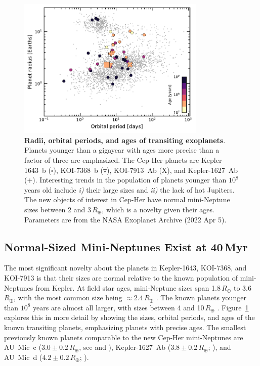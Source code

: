 \documentclass[12pt,twocolumn]{aastex63}
\begin{document}
\begin{figure}[!t]
	\begin{center}
		\leavevmode
		\includegraphics[width=0.8\textwidth]{f4.pdf}
	\end{center}
	\vspace{-0.6cm}
	\caption{
		{\bf Radii, orbital periods, and ages of transiting exoplanets}.
    Planets younger than a gigayear with ages more precise than a
    factor of three are emphasized. The Cep-Her planets are
    Kepler-1643~b ($\square$), KOI-7368~b ($\triangledown$),
    KOI-7913~Ab (X), and Kepler-1627~Ab (+).  Interesting trends in
    the population of planets younger than $10^8$ years old include {\it i)} their
    large sizes and {\it ii)} the lack of hot Jupiters.  The new
    objects of interest in Cep-Her have normal mini-Neptune sizes
    between 2 and 3\,$R_\oplus$, which is a novelty given their ages.
    Parameters are from the NASA Exoplanet Archive (2022 Apr 5).
		\label{fig:rp_period_age}
	}
\end{figure}


\subsection{Normal-Sized Mini-Neptunes Exist at 40$\,$Myr}
\label{subsec:sizes}

The most significant novelty about the planets in Kepler-1643, KOI-7368, and
KOI-7913 is that their sizes are normal relative to the known
population of mini-Neptunes from Kepler.  At field star ages,
mini-Neptune sizes span 1.8\,$R_\oplus$ to 3.6\,$R_\oplus$, with the
most common size being $\approx 2.4\,R_\oplus$
\citep[][Figure~7]{Fulton_et_al_2017}.  The known planets younger than
$10^8$ years are almost all larger, with sizes between 4 and
10$\,R_\oplus$
\citep{Mann_K2_33b_2016,David_et_al_2016,benatti_possibly_2019,david_four_2019,newton_tess_2019,rizzuto_tess_2020,bouma_cluster_2020,mann_toi1227_2022}.
Figure~\ref{fig:rp_period_age} explores this in more detail by showing
the sizes, orbital periods, and ages of the known transiting planets,
emphasizing planets with precise ages.  The smallest previously known
planets comparable to the new Cep-Her mini-Neptunes are AU~Mic~c
($3.0\pm0.2\,R_\oplus$, see \citealt{martioli_aumicbc_2021} and
\citealt{gilbert_flares_2022}), Kepler-1627~Ab ($3.8\pm0.2\,R_\oplus$;
\citealt{bouma_kep1627_2022}), and AU~Mic~d ($4.2\pm0.2\,R_\oplus$;
\citealt{plavchan_planet_2020}).
\end{document}
